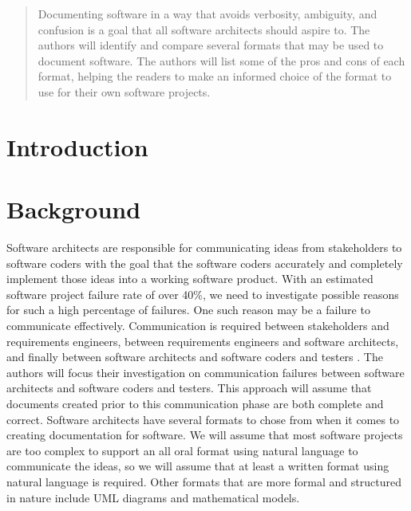 \documentclass{acm_proc_article-sp}
\begin{document}
\maketitle
\begin{abstract}
Documenting software in a way that avoids verbosity, ambiguity, and confusion is a goal that all software architects should aspire to. The authors will identify and compare several formats that may be used to document software. The authors will list some of the pros and cons of each format, helping the readers to make an informed choice of the format to use for their own software projects.
\end{abstract}





\section{Introduction}



\section{Background}
Software architects are responsible for communicating ideas from stakeholders to software coders with the goal that the software coders accurately and completely implement those ideas into a working software product.\newline
With an estimated software project failure rate of over 40\%, we need to investigate possible reasons for such a high percentage of failures. One such reason may be a failure to communicate effectively. Communication is required between stakeholders and requirements engineers, between requirements engineers and software architects, and finally between software architects and software coders and testers \cite{Lamport:RequirementsEngineering}. The authors will focus their investigation on communication failures between software architects and software coders and testers. This approach will assume that documents created prior to this communication phase are both complete and correct.\newline
Software architects have several formats to chose from when it comes to creating documentation for software. We will assume that most software projects are too complex to support an all oral format using natural language to communicate the ideas, so we will assume that at least a written format using natural language is required. Other formats that are more formal and structured in nature include UML diagrams and mathematical models.
\end{document}
